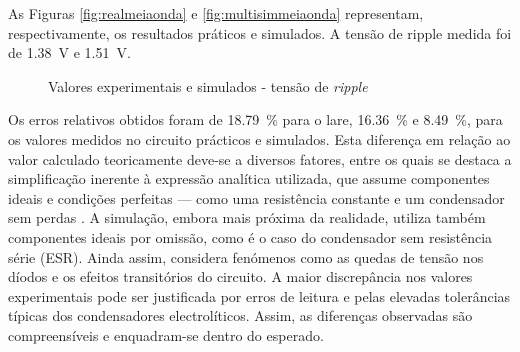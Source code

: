 As Figuras \ref{fig:realmeiaonda} e \ref{fig:multisimmeiaonda} representam, respectivamente, os resultados práticos e simulados. A tensão de ripple medida foi de \SI{1.38}{\volt} e \SI{1.51}{\volt}.

\begin{figure}[hbtp]
	\centering%
		\centering
		\qquad
		\caption{Valores experimentais e simulados - tensão de \textit{ripple}}%
		\label{fig:simulacaoripple}%
	\end{figure}

Os erros relativos obtidos foram de \SI{18.79}{\percent} para o \acrshort{lare}, \SI{16.36}{\percent} e \SI{8.49}{\percent}, para os valores medidos no circuito prácticos e simulados. Esta diferença em relação ao valor calculado teoricamente deve-se a diversos fatores, entre os quais se destaca a simplificação inerente à expressão analítica utilizada, que assume componentes ideais e condições perfeitas — como uma resistência constante e um condensador sem perdas \cite{sedrasmith}. A simulação, embora mais próxima da realidade, utiliza também componentes ideais por omissão, como é o caso do condensador sem resistência série (ESR). Ainda assim, considera fenómenos como as quedas de tensão nos díodos e os efeitos transitórios do circuito. A maior discrepância nos valores experimentais pode ser justificada por erros de leitura e pelas elevadas tolerâncias típicas dos condensadores electrolíticos. Assim, as diferenças observadas são compreensíveis e enquadram-se dentro do esperado.


